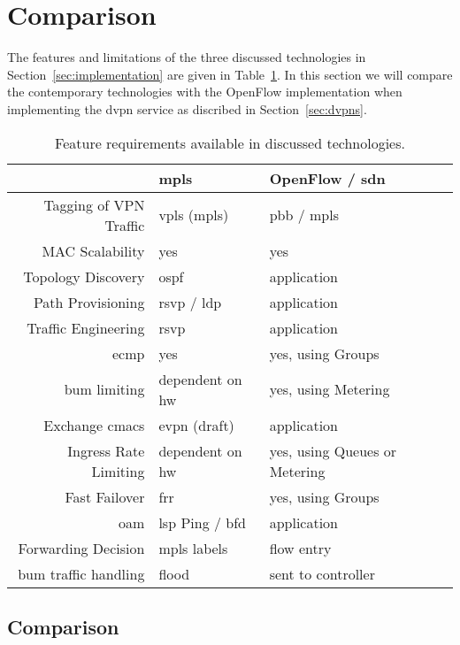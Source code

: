 \section{Comparison} %
\label{sec:results}

The features and limitations of the three discussed technologies in Section~\ref{sec:implementation} are given in Table~\ref{tb:reqs}. In this section we will compare the contemporary technologies with the OpenFlow implementation when implementing the \ac{dvpn} service as discribed in Section~\ref{sec:dvpns}.

\begin{table}[h]
	\centering
	\begin{tabular}{r|lll}
	 & \acs{mpls} & OpenFlow / \acs{sdn}\\
	\hline
	Tagging of VPN Traffic & \acs{vpls} (\acs{mpls}) & \acs{pbb} / \acs{mpls}\\
	MAC Scalability & yes & yes\\
	Topology Discovery & \acs{ospf} & application\\
	Path Provisioning & \acs{rsvp} / \acs{ldp} & application\\
	Traffic Engineering & \acs{rsvp} & application\\
	\ac{ecmp} & yes & yes, using Groups\\
	\ac{bum} limiting & dependent on \acs{hw} & yes, using Metering\\
	Exchange \acsp{cmac} & \ac{evpn} (draft) & application\\
	Ingress Rate Limiting & dependent on \acs{hw} & yes, using Queues or Metering\\
	Fast Failover & \acs{frr} & yes, using Groups\\
	\acs{oam} & \acs{lsp} Ping / \acs{bfd} & application\\
	\hline
	Forwarding Decision & \acs{mpls} labels & flow entry \\
	\ac{bum} traffic handling & flood & sent to controller\\
	\end{tabular}
	\caption{Feature requirements available in discussed technologies.}
	\label{tb:reqs}
\end{table}


\subsection{Comparison} %
\label{sub:comparison}


